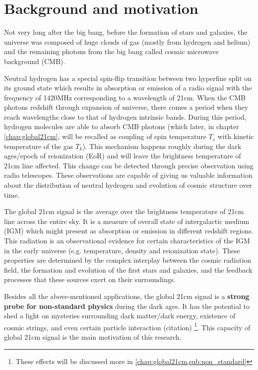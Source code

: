 \documentclass[12pt, TexShade, letterpaper]{report}
\begin{document}
\section{Background and motivation}
Not very long after the big bang, before the formation of stars and galaxies, the universe was composed of huge clouds of gas (mostly from hydrogen and helium) and the remaining photons from the big bang called cosmic microwave background (CMB). \par
Neutral hydrogen has a special spin-flip transition between two hyperfine split on its ground state which results in absorption or emission of a radio signal with the frequency of 1420MHz corresponding to a wavelength of 21cm. When the CMB photons redshift through expansion of universe, there comes a period when they reach wavelengths close to that of hydrogen intrinsic bands. During this period, hydrogen molecules are able to absorb CMB photons (which later, in chapter \ref{chap:global21cm}, will be recalled as coupling of spin temperature $T_s$ with kinetic temperature of the gas $T_k$). This mechanism happens roughly during the dark ages/epoch of reionization (EoR) and will leave the brightness temperature of 21cm line affected. This change can be detected through precise observation using radio telescopes. These observations are capable of giving us valuable information about the distribution of neutral hydrogen and evolution of cosmic structure over time\cite{low_frequency}.\par
The global 21cm signal is the average over the brightness temperature of 21cm line across the entire sky. It is a measure of overall state of intergalactic medium (IGM) which might present as absorption or emission in different redshift regions. This radiation is an observational evidence for certain characteristics of the IGM in the early universe (e.g. temperature, density and reionization state). These properties are determined by the complex interplay between the cosmic radiation field, the formation and evolution of the first stars and galaxies, and the feedback processes that these sources exert on their surroundings\cite{21century}.\par
Besides all the above-mentioned applications, the global 21cm signal is a \textbf{strong probe for non-standard physics} during the dark ages. It has the potential to shed a light on mysteries surrounding dark matter/dark energy, existence of cosmic strings, and even certain particle interaction (citation) \footnote{These effects will be discussed more in \ref{chap:global21cm,sub:non_standard}}. This capacity of global 21cm signal is the main motivation of this research.\par
\end{document}
